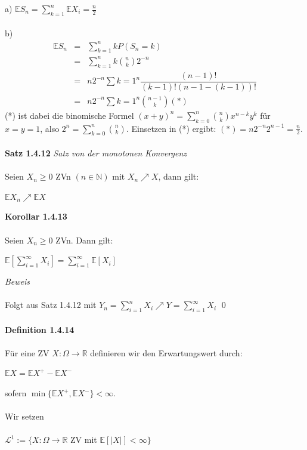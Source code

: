 \documentclass[10pt,a4paper]{report}
\numberwithin{equation}{section}
\numberwithin{figure}{section}
\theoremstyle{plain}
\theoremstyle{definition}
\theoremstyle{plain}
\theoremstyle{definition}
\theoremstyle{remark}
\theoremstyle{plain}
\begin{document}
a) $\mathbb{E}S_n=\sum\limits_{k=1}^n\mathbb{E}X_i=\frac{n}{2}$\\\\
b)\begin{eqnarray*}
\mathbb{E}S_n&=&\sum\limits_{k=1}^nkP(S_n=k)\\
&=& \sum\limits_{k=1}^nk\binom{n}{k}2^{-n}\\
&=& n 2^{-n} \sum\limits{k=1}^n\dfrac{(n-1)!}{(k-1)!(n-1-(k-1))!}\\
&=& n 2^{-n} \sum\limits{k=1}^n \binom{n-1}{k} (*)
\end{eqnarray*}
(*) ist dabei die binomische Formel $(x+y)^n=\sum\limits_{k=0}^n\binom{n}{k}x^{n-k}y^k$ für $x=y=1$, also $2^n=\sum\limits_{k=0}^n\binom{n}{k}$. Einsetzen in (*) ergibt: $(*)=n2^{-n}2^{n-1}=\frac{n}{2}$.\\\\
\textbf{Satz 1.4.12} \textit{Satz von der monotonen Konvergenz}\\\\
Seien $X_n\geq 0$ ZVn $(n \in \mathbb{N})$ mit $X_n \nearrow X$, dann gilt:
\begin{center}
$\mathbb{E}X_n \nearrow \mathbb{E}X$
\end{center} 
\textbf{Korollar 1.4.13}\\\\
Seien $X_n \geq 0$ ZVn. Dann gilt:
\begin{center}
$\mathbb{E}[\sum\limits_{i=1}^\infty X_i]=\sum\limits_{i=1}^\infty\mathbb{E}[X_i]$
\end{center}
\textit{Beweis}\\\\
Folgt aus Satz 1.4.12 mit $Y_n=\sum\limits_{i=1}^nX_i \nearrow Y= \sum\limits_{i=1}^\infty X_i$ \qed\\\\
\textbf{Definition 1.4.14}\\\\
Für eine ZV $X:\Omega \to \mathbb{R}$ definieren wir den Erwartungswert durch:
\begin{center}
$\mathbb{E}X=\mathbb{E}X^+-\mathbb{E}X^-$
\end{center} 
sofern $\min\{\mathbb{E}X^+,\mathbb{E}X^-\}<\infty$.\\\\
Wir setzen\\\\
$\mathcal{L}^1:=\{X:\Omega \to \mathbb{R}$ ZV mit $\mathbb{E}[|X|]< \infty \}$\\\\
\end{document}
